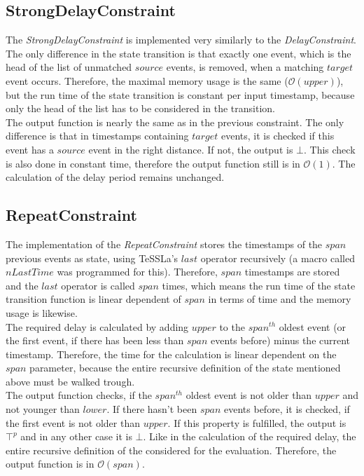 \subsection{StrongDelayConstraint}
	The \emph{StrongDelayConstraint} is implemented very similarly to the \emph{DelayConstraint}. The only difference in the state transition is that exactly one event, which is the head of the list of unmatched $source$ events, is removed, when a matching $target$ event occurs. Therefore, the maximal memory usage is the same ($\mathcal{O}(upper)$), but the run time of the state transition is constant per input timestamp, because only the head of the list has to be considered in the transition.\\
	The output function is nearly the same as in the previous constraint. The only difference is that in timestamps containing $target$ events, it is checked if this event has a $source$ event in the right distance. If not, the output is $\bot$. This check is also done in constant time, therefore the output function still is in $\mathcal{O}(1)$. The calculation of the delay period remains unchanged.
	
\subsection{RepeatConstraint}
	The implementation of the \emph{RepeatConstraint} stores the timestamps of the $span$ previous events as state, using TeSSLa's $last$ operator recursively (a macro called $nLastTime$ was programmed for this). Therefore, $span$ timestamps are stored and the $last$ operator is called $span$ times, which means the run time of the state transition function is linear dependent of $span$ in terms of time and the memory usage is likewise.\\
	The required delay is calculated by adding $upper$ to the  $span^{th}$ oldest event (or the first event, if there has been less than $span$ events before) minus the current timestamp. Therefore, the time for the calculation is linear dependent on the $span$ parameter, because the entire recursive definition of the state mentioned above must be walked trough.\\
	The output function checks, if the $span^{th}$ oldest event is not older than $upper$ and not younger than $lower$. If there hasn't been $span$ events before, it is checked, if the first event is not older than $upper$. If this property is fulfilled, the output is $\top^p$ and in any other case it is $\bot$. Like in the calculation of the required delay, the entire recursive definition of the considered for the evaluation. Therefore, the output function is in $\mathcal{O}(span)$.
	
